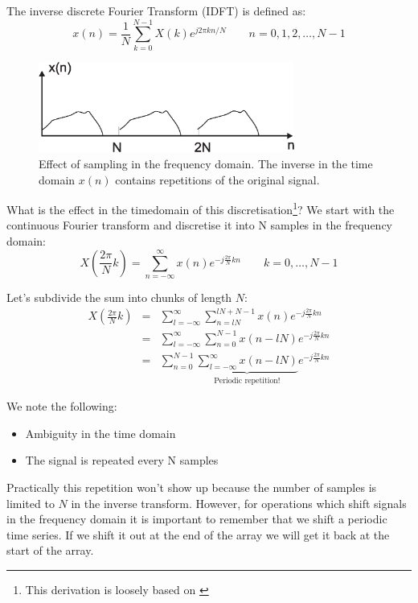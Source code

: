 \documentclass[12pt,a4paper]{article}
\begin{document}
The inverse discrete Fourier Transform (IDFT) is defined as:
\begin{equation}
x(n) = \frac{1}{N} \sum_{k=0}^{N-1} X(k) e^{j 2\pi kn/N} \qquad n=0,1,2,\ldots, N-1
\end{equation}

\begin{figure}[!hbt]
\begin{center}
\mbox{\includegraphics[width=0.75\textwidth]{time_alias}}
\end{center}
\caption{Effect of sampling in the frequency domain. The
inverse in the time domain $x(n)$ contains repetitions of
the original signal.
\label{time_alias}}
\end{figure}


What is the effect in the timedomain of this discretisation\footnote{This derivation is loosely based on \citet{Proakis1996}}? We start with
the continuous Fourier transform
and discretise it into N samples in the frequency domain:
\begin{equation}
X\left(\frac{2\pi}{N}k\right) = \sum_{n = -\infty}^{\infty} x(n) e^{-j\frac{2\pi}{N}kn} \qquad k = 0, \ldots, N-1
\end{equation}

Let's subdivide the sum into chunks of length $N$:
\begin{eqnarray}
X\left(\frac{2\pi}{N}k\right) 
& = &
\sum_{l = -\infty}^{\infty} \sum_{n=lN}^{lN+N-1} x(n)e^{-j \frac{2\pi}{N}kn} \\
& = & \sum_{l=-\infty}^{\infty} \sum_{n=0}^{N-1} x(n-lN) e^{-j \frac{2\pi}{N} kn} \\
& = & \sum_{n=0}^{N-1} \underbrace{\sum_{l=-\infty}^{\infty} x(n - lN)}_{\mbox{Periodic repetition!}} e^{-j \frac{2\pi}{N}kn}
\end{eqnarray}

We note the following:
\begin{itemize}
\item Ambiguity in the time domain
\item The signal is repeated every N samples
\end{itemize}
Practically this repetition won't show up because
the number of samples is limited to $N$ in the inverse transform.
However, for operations which shift signals in the frequency domain
it is important to remember that we shift a periodic time series. If
we shift it out at the end of the array we will get it back at the
start of the array.
\end{document}
